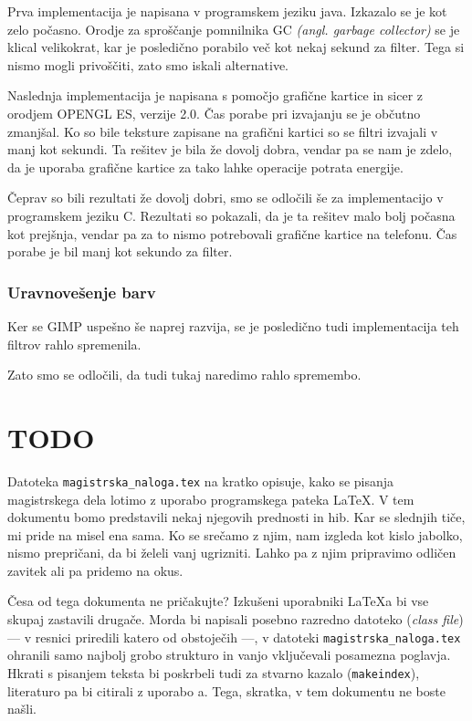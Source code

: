 Prva implementacija je napisana v programskem jeziku java. Izkazalo se je kot zelo počasno. Orodje za sproščanje pomnilnika GC \textit{(angl. garbage collector)} se je klical velikokrat, kar je posledično porabilo več kot nekaj sekund za filter. Tega si nismo mogli privoščiti, zato smo iskali alternative. 

Naslednja implementacija je napisana s pomočjo grafične kartice in sicer z orodjem OPENGL ES, verzije 2.0. Čas porabe pri izvajanju se je občutno zmanjšal. Ko so bile teksture zapisane na grafični kartici so se filtri izvajali v manj kot sekundi. Ta rešitev je bila že dovolj dobra, vendar pa se nam je zdelo, da je uporaba grafične kartice za tako lahke operacije potrata energije.  

Čeprav so bili rezultati že dovolj dobri, smo se odločili še za implementacijo v programskem jeziku C. Rezultati so pokazali, da je ta rešitev malo bolj počasna kot prejšnja, vendar pa za to nismo potrebovali grafične kartice na telefonu. Čas porabe je bil manj kot sekundo za filter.

\subsection{Uravnovešenje barv}

Ker se GIMP uspešno še naprej razvija, se je posledično tudi implementacija teh filtrov rahlo spremenila. 

Zato smo se odločili, da tudi tukaj naredimo rahlo spremembo. 


\chapter{TODO}
Datoteka {\tt magistrska\_naloga.tex} na kratko opisuje, kako se pisanja magistrskega dela lotimo z uporabo programskega pateka \LaTeX. V tem dokumentu bomo predstavili nekaj njegovih prednosti in hib. Kar se slednjih tiče, mi pride na misel ena sama. Ko se srečamo z njim, nam izgleda kot kislo jabolko, nismo prepričani, da bi želeli vanj ugrizniti. Lahko pa z njim pripravimo odličen zavitek ali pa pridemo na okus.

Česa od tega dokumenta ne pričakujte? Izkušeni uporabniki \LaTeX{}a bi vse skupaj zastavili
drugače. Morda bi napisali posebno razredno datoteko (\emph{class file}) --- v resnici priredili katero od obstoječih ---, v datoteki {\tt magistrska\_naloga.tex} ohranili samo najbolj grobo strukturo in vanjo vključevali  posamezna po\-glav\-ja. Hkrati s pisanjem teksta bi poskrbeli tudi za stvarno kazalo ({\tt makeindex}), literaturo pa bi citirali z uporabo {\BibTeX}{a}. Tega, skratka, v tem dokumentu ne boste našli.

